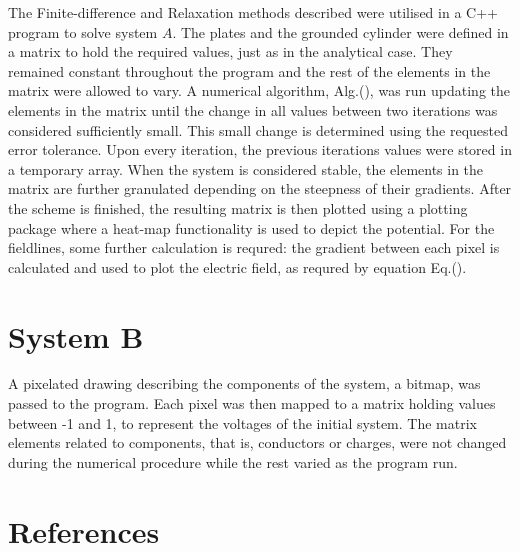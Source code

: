 \documentclass[a4paper]{jpconf}
\begin{document}
The Finite-difference and Relaxation methods described were utilised in a C++ program to solve system $A$.
The plates and the grounded cylinder were defined in a matrix to hold the required values, just as in the analytical case. They remained constant throughout the program and the rest of the elements in the matrix were allowed to vary. A numerical algorithm, Alg.(), was run updating the elements in the matrix until the change in all values between two iterations was considered sufficiently small. This small change is determined using the requested error tolerance. Upon every iteration, the previous iterations values were stored in a temporary array.  When the system is considered stable, the elements in the matrix are further granulated depending on the steepness of their gradients.
After the scheme is finished, the resulting matrix is then plotted using a plotting package where a heat-map functionality is used to depict the potential. For the fieldlines, some further calculation is requred: the gradient between each pixel is calculated and used to plot the electric field, as requred by equation Eq.().


\section*{System B}

A pixelated drawing describing the components of the system, a bitmap, was passed to the program. Each pixel was then mapped to a matrix holding values between -1 and 1, to represent the voltages of the initial system. The matrix elements related to components, that is, conductors or charges, were not changed during the numerical procedure while the rest varied as the program run.


\section*{References}


\end{document}
